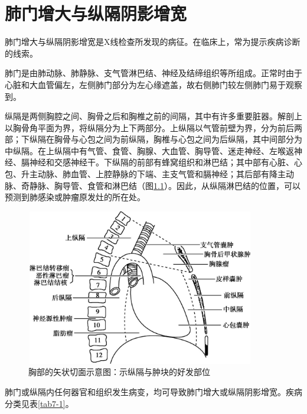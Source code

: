 \chapter{肺门增大与纵隔阴影增宽}

肺门增大与纵隔阴影增宽是X线检查所发现的病征。在临床上，常为提示疾病诊断的线索。

肺门是由肺动脉、肺静脉、支气管淋巴结、神经及结缔组织等所组成。正常时由于心脏和大血管偏左，左侧肺门部分为左心缘遮盖，故右侧肺门较左侧肺门易于观察到。

纵隔是两侧胸腔之间、胸骨之后和胸椎之前的间隔，其中有许多重要脏器。解剖上以胸骨角平面为界，将纵隔分为上下两部分。上纵隔以气管前壁为界，分为前后两部；下纵隔在胸骨与心包之间为前纵隔，胸椎与心包之间为后纵隔，其中间部分为中纵隔。在上纵隔中有气管、食管、胸腺、大血管、胸导管、迷走神经、左喉返神经、膈神经和交感神经干。下纵隔的前部有蜂窝组织和淋巴结；其中部有心脏、心包、升主动脉、肺血管、上腔静脉的下端、主支气管和膈神经；其后部有降主动脉、奇静脉、胸导管、食管和淋巴结（图\ref{fig7-1}）。因此，从纵隔淋巴结的位置，可以预测到肺感染或肿瘤原发灶的所在处。

\begin{figure}[!htbp]
 \centering
 \includegraphics[width=3.9375in,height=2.6875in]{./images/Image00051.jpg}
 \captionsetup{justification=centering}
 \caption{胸部的矢状切面示意图：示纵隔与肿块的好发部位}
 \label{fig7-1}
  \end{figure} 

肺门或纵隔内任何器官和组织发生病变，均可导致肺门增大或纵隔阴影增宽。疾病分类见表\ref{tab7-1}。

